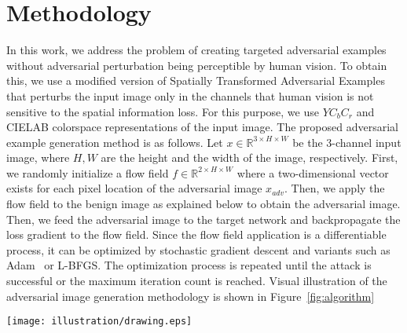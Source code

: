 \chapter{Methodology}
\label{chp:3_methodology}
In this work, we address the problem of creating targeted adversarial examples without adversarial perturbation being perceptible by human vision. To obtain this, we use a modified version of Spatially Transformed Adversarial Examples~\cite{xiao2018spatially} that perturbs the input image only in the channels that human vision is not sensitive to the spatial information loss. For this purpose, we use \(YC_{b}C_{r}\) and CIELAB colorspace representations of the input image. The proposed adversarial example generation method is as follows. Let \(x \in \mathbb{R}^{3\times H \times W}\) be the 3-channel input image, where \(H, W\) are the height and the width of the image, respectively. First, we randomly initialize a flow field \(f \in \mathbb{R}^{2\times H \times W}\) where a two-dimensional vector exists for each pixel location of the adversarial image \(x_{adv}\). Then, we apply the flow field to the benign image as explained below to obtain the adversarial image. Then, we feed the adversarial image to the target network and backpropagate the loss gradient to the flow field. Since the flow field application is a differentiable process, it can be optimized by stochastic gradient descent and variants such as Adam~\cite{kingma2015adam} or L-BFGS\cite{liu1989limited}. The optimization process is repeated until the attack is successful or the maximum iteration count is reached. Visual illustration of the adversarial image generation methodology is shown in Figure~\ref{fig:algorithm}

\begin{figure*}[t]
    \centering
    \texttt{[image: illustration/drawing.eps]}
    \caption{Visual illustration of the proposed adversarial example generation method. Luminance and chrominance channels are Y and \(C_{b}C_{r}\) when \(YC_{b}C_{r}\) colorspace and L and \(a^*b^*\) when CIELAB colorspace is used. Visual representation of flow field, subpixel restriction by \(\tanh\) and conversion of concatenated image back to RGB colorspace is omitted for brevity.}\label{fig:algorithm}
\end{figure*}

